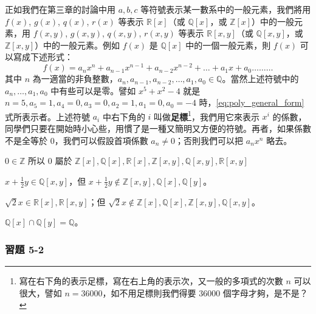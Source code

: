 正如我們在第三章的討論中用 $a, b, c$ 等符號表示某一數系中的一般元素，我們將用 $f(x)$, $g(x)$, $q(x)$, $r(x)$ 等表示 $\mathbb{R}[x]$（或 $\mathbb{Q}[x]$，或 $\mathbb{Z}[x]$）中的一般元素，用 $f(x,y)$, $g(x,y)$, $q(x,y)$, $r(x,y)$ 等表示 $\mathbb{R}[x,y]$（或 $\mathbb{Q}[x,y]$，或 $\mathbb{Z}[x,y]$）中的一般元素。例如 $f(x)$ 是 $\mathbb{Q}[x]$ 中的一個一般元素，則 $f(x)$ 可以寫成下述形式：
\begin{equation}\label{eq:poly_general_form}
  f(x) = a_n x^n + a_{n-1} x^{n-1} + a_{n-2} x^{n-2} + \dots + a_1 x + a_0 \dots\dots\dots
\end{equation}
其中 $n$ 為一適當的非負整數，$a_n, a_{n-1}, a_{n-2}, \dots, a_1, a_0 \in \mathbb{Q}$。當然上述符號中的 $a_n, \dots, a_1, a_0$ 中有些可以是零。譬如 $x^5+x^2-4$ 就是 $n=5, a_5=1, a_4=0, a_3=0, a_2=1, a_1=0, a_0=-4$ 時，\eqref{eq:poly_general_form} 式所表示者。上述符號 $a_i$ 中右下角的 $i$ 叫做\textbf{足標}\footnote{寫在右下角的表示足標，寫在右上角的表示次，又一般的多項式的次數 $n$ 可以很大，譬如 $n=36000$，如不用足標則我們得要 $36000$ 個字母才夠，是不是？}，我們用它來表示 $x^i$ 的係數，同學們只要在開始時小心些，用慣了是一種又簡明又方便的符號。再者，如果係數不是全等於 $0$，我們可以假設首項係數 $a_n \neq 0$；否則我們可以把 $a_n x^n$ 略去。

\begin{example}\label{ex:5-2-1}
$0 \in \mathbb{Z}$ 所以 $0$ 屬於 $\mathbb{Z}[x], \mathbb{Q}[x], \mathbb{R}[x], \mathbb{Z}[x,y], \mathbb{Q}[x,y], \mathbb{R}[x,y]$
\end{example}

\begin{example}\label{ex:5-2-2}
$x+\frac{1}{2}y \in \mathbb{Q}[x,y]$，但 $x+\frac{1}{2}y \notin \mathbb{Z}[x,y], \mathbb{Q}[x], \mathbb{Q}[y]$。
\end{example}

\begin{example}\label{ex:5-2-3}
$\sqrt{2}x \in \mathbb{R}[x], \mathbb{R}[x,y]$；但 $\sqrt{2}x \notin \mathbb{Z}[x], \mathbb{Q}[x], \mathbb{Z}[x,y], \mathbb{Q}[x,y]$。
\end{example}

\begin{example}\label{ex:5-2-4}
$\mathbb{Q}[x] \cap \mathbb{Q}[y] = \mathbb{Q}$。
\end{example}

\subsubsection*{習題 5-2}\label{sec:ex5-2}

